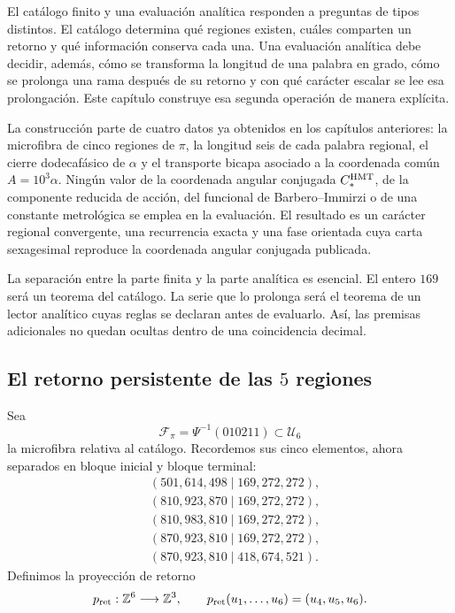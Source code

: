 El catálogo finito y una evaluación analítica responden a preguntas de tipos
distintos. El catálogo determina qué regiones existen, cuáles comparten un
retorno y qué información conserva cada una. Una evaluación analítica debe
decidir, además, cómo se transforma la longitud de una palabra en grado, cómo
se prolonga una rama después de su retorno y con qué carácter escalar se lee
esa prolongación. Este capítulo construye esa segunda operación de manera
explícita.

La construcción parte de cuatro datos ya obtenidos en los capítulos
anteriores: la microfibra de cinco regiones de \(\pi\), la longitud seis de
cada palabra regional, el cierre dodecafásico de \(\alpha\) y el transporte
bicapa asociado a la coordenada común
\(A=10^3\alpha\). Ningún valor de la coordenada angular conjugada \(C_*^{\rm HMT}\), de la componente reducida de
acción, del funcional de Barbero--Immirzi o de una constante metrológica se
emplea en la evaluación. El resultado es un carácter regional convergente,
una recurrencia exacta y una fase orientada cuya carta sexagesimal reproduce
la coordenada angular conjugada publicada.

La separación entre la parte finita y la parte analítica es esencial. El
entero \(169\) será un teorema del catálogo. La serie que lo prolonga será el
teorema de un lector analítico cuyas reglas se declaran antes de evaluarlo.
Así, las premisas adicionales no quedan ocultas dentro de una coincidencia
decimal.

\subsection{El retorno persistente de las \(5\) regiones}

Sea
\[
\mathcal F_\pi=\Psi^{-1}(010211)\subset\mathcal U_6
\]
la microfibra relativa al catálogo. Recordemos sus cinco elementos, ahora
separados en bloque inicial y bloque terminal:
\[
\begin{aligned}
 &(501,614,498\mid169,272,272),\\
 &(810,923,870\mid169,272,272),\\
 &(810,983,810\mid169,272,272),\\
 &(870,923,810\mid169,272,272),\\
 &(870,923,810\mid418,674,521).
\end{aligned}
\]
Definimos la proyección de retorno
\[
p_{\rm ret}:\mathbb Z^6\longrightarrow\mathbb Z^3,
\qquad
p_{\rm ret}(u_1,\ldots,u_6)=(u_4,u_5,u_6).
\]

